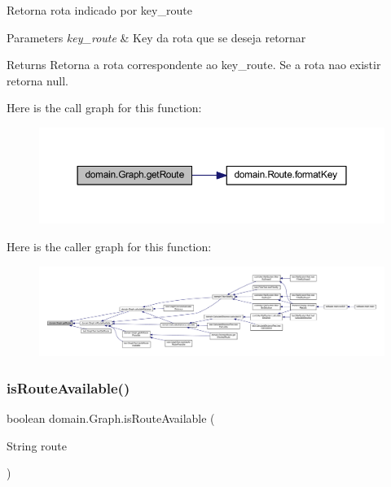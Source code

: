 Retorna rota indicado por key\+\_\+route


\begin{DoxyParams}{Parameters}
{\em key\+\_\+route} & Key da rota que se deseja retornar \\
\hline
\end{DoxyParams}
\begin{DoxyReturn}{Returns}
Retorna a rota correspondente ao key\+\_\+route. Se a rota nao existir retorna null. 
\end{DoxyReturn}
Here is the call graph for this function\+:\nopagebreak
\begin{figure}[H]
\begin{center}
\leavevmode
\includegraphics[width=350pt]{classdomain_1_1_graph_a3499aec1dfba7e73b34007cb4271e192_cgraph}
\end{center}
\end{figure}
Here is the caller graph for this function\+:\nopagebreak
\begin{figure}[H]
\begin{center}
\leavevmode
\includegraphics[width=350pt]{classdomain_1_1_graph_a3499aec1dfba7e73b34007cb4271e192_icgraph}
\end{center}
\end{figure}
\mbox{\label{classdomain_1_1_graph_ab5da77fcafda90e249b7c3c049ccc3ff}} 
\subsubsection{\texorpdfstring{is\+Route\+Available()}{isRouteAvailable()}}
{\footnotesize\ttfamily boolean domain.\+Graph.\+is\+Route\+Available (\begin{DoxyParamCaption}\item[{String}]{route }\end{DoxyParamCaption})}

